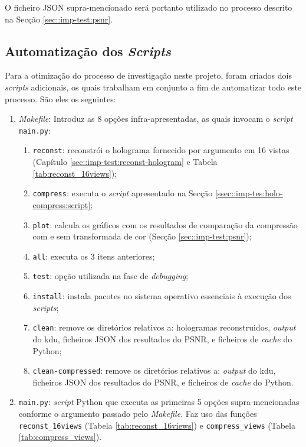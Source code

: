 O ficheiro \ac{JSON} supra-mencionado será portanto utilizado no processo descrito na Secção \ref{sec::imp-test:psnr}.


\subsection{Automatização dos \textit{Scripts}}
\label{ssec::imp-test:holo-compress:auto-script}

Para a otimização do processo de investigação neste projeto, foram criados dois \textit{scripts} adicionais, os quais trabalham em conjunto a fim de automatizar todo este processo. São eles os seguintes:
\begin{enumerate}
    \item \textit{Makefile}: Introduz as 8 opções infra-apresentadas, as quais invocam o \textit{script} \verb|main.py|: 
        \begin{enumerate}
            \item \verb|reconst|: reconstrói o holograma fornecido por argumento em 16 vistas (Capítulo \ref{sec::imp-test:reconst-hologram} e Tabela \ref{tab:reconst_16views});
            \item \verb|compress|: executa o \textit{script} apresentado na Secção \ref{ssec::imp-tes:holo-compress:script};
            \item \verb|plot|: calcula os gráficos com os resultados de comparação da   compressão com e sem transformada de cor (Secção \ref{sec::imp-test:psnr});
            \item \verb|all|: executa os 3 itens anteriores;
            \item \verb|test|: opção utilizada na fase de \textit{debugging};
            \item \verb|install|: instala pacotes no sistema operativo essenciais à execução dos \textit{scripts};
            \item \verb|clean|: remove os diretórios relativos a: hologramas reconstruidos, \textit{output} do \ac{kdu}, ficheiros \ac{JSON} dos resultados do \ac{PSNR}, e ficheiros de \textit{cache} do Python;
            \item \verb|clean-compressed|: remove os diretórios relativos a: \textit{output} do \ac{kdu}, ficheiros \ac{JSON} dos resultados do \ac{PSNR}, e ficheiros de \textit{cache} do Python.
        \end{enumerate}
    \item \verb|main.py|: \textit{script} Python que executa as primeiras 5 opções supra-mencionadas conforme o argumento passado pelo \textit{Makefile}. Faz uso das funções \verb|reconst_16views| (Tabela \ref{tab:reconst_16views}) e \verb|compress_views| (Tabela \ref{tab:compress_views}).
\end{enumerate}


